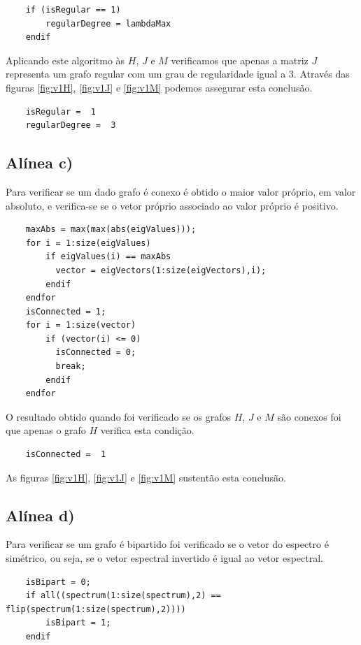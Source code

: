 \documentclass[a4paper,12pt]{report}
\begin{document}
\begin{lstlisting}
    if (isRegular == 1)
        regularDegree = lambdaMax
    endif
\end{lstlisting}

Aplicando este algoritmo às $H$, $J$ e $M$ verificamos que apenas a matriz $J$ representa um grafo regular com um grau de regularidade igual a $3$. Através das figuras \ref{fig:v1H}, \ref{fig:v1J} e \ref{fig:v1M} podemos assegurar esta conclusão.

\begin{lstlisting}
    isRegular =  1
    regularDegree =  3
\end{lstlisting}

\subsection*{Alínea c)}

Para verificar se um dado grafo é conexo é obtido o maior valor próprio, em valor absoluto, e verifica-se se o vetor próprio associado ao valor próprio é positivo.

\begin{lstlisting}
    maxAbs = max(max(abs(eigValues)));
    for i = 1:size(eigValues)
        if eigValues(i) == maxAbs
          vector = eigVectors(1:size(eigVectors),i);
        endif
    endfor
    isConnected = 1;
    for i = 1:size(vector)
        if (vector(i) <= 0)
          isConnected = 0;
          break;
        endif
    endfor
\end{lstlisting}

O resultado obtido quando foi verificado se os grafos $H$, $J$ e $M$ são conexos foi que apenas o grafo $H$ verifica esta condição. 

\begin{lstlisting}
    isConnected =  1
\end{lstlisting}

As figuras \ref{fig:v1H}, \ref{fig:v1J} e \ref{fig:v1M} sustentão esta conclusão.

\subsection*{Alínea d)}

Para verificar se um grafo é bipartido foi verificado se o vetor do espectro é simétrico, ou seja, se o vetor espectral invertido é igual ao vetor espectral.

\begin{lstlisting}
    isBipart = 0;
    if all((spectrum(1:size(spectrum),2) == flip(spectrum(1:size(spectrum),2))))
        isBipart = 1;
    endif
\end{lstlisting}
\end{document}
